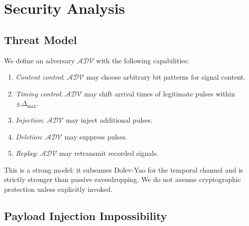 \documentclass[twocolumn,10pt]{article}
\begin{document}
\section{Security Analysis}
\label{sec:security}

\subsection{Threat Model}

We define an adversary $\mathcal{ADV}$ with the following
capabilities:
\begin{enumerate}[leftmargin=1.5em,topsep=2pt,itemsep=1pt]
  \item[\textbf{C1}] \emph{Content control}: $\mathcal{ADV}$ may
    choose arbitrary bit patterns for signal content.
  \item[\textbf{C2}] \emph{Timing control}: $\mathcal{ADV}$ may
    shift arrival times of legitimate pulses within $\pm \Delta_{\max}$.
  \item[\textbf{C3}] \emph{Injection}: $\mathcal{ADV}$ may inject
    additional pulses.
  \item[\textbf{C4}] \emph{Deletion}: $\mathcal{ADV}$ may suppress
    pulses.
  \item[\textbf{C5}] \emph{Replay}: $\mathcal{ADV}$ may retransmit
    recorded signals.
\end{enumerate}

This is a strong model: it subsumes Dolev-Yao for the temporal channel
and is strictly stronger than passive eavesdropping. We do not assume
cryptographic protection unless explicitly invoked.

\subsection{Payload Injection Impossibility}
\end{document}
